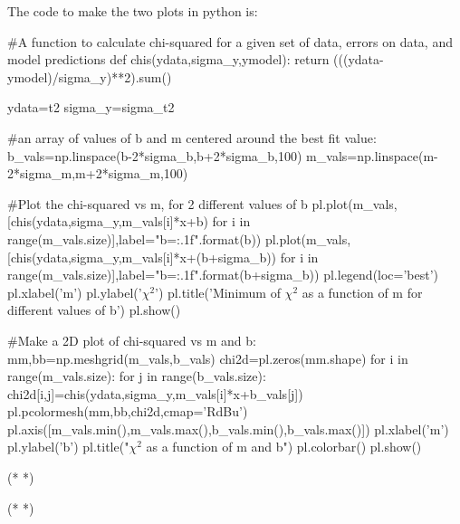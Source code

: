 The code to make the two plots in python is:
\begin{python}[caption = Plot chi-squared as a function of the fit parameters] 
#A function to calculate chi-squared for a given set of data, errors on data, and model predictions
def chis(ydata,sigma_y,ymodel):
    return (((ydata-ymodel)/sigma_y)**2).sum()

ydata=t2
sigma_y=sigma_t2

#an array of values of b and m centered around the best fit value:
b_vals=np.linspace(b-2*sigma_b,b+2*sigma_b,100)
m_vals=np.linspace(m-2*sigma_m,m+2*sigma_m,100)
    
#Plot the chi-squared vs m, for 2 different values of b    
pl.plot(m_vals,[chis(ydata,sigma_y,m_vals[i]*x+b) for i in range(m_vals.size)],label="b={:.1f}".format(b))
pl.plot(m_vals,[chis(ydata,sigma_y,m_vals[i]*x+(b+sigma_b)) for i in range(m_vals.size)],label="b={:.1f}".format(b+sigma_b))
pl.legend(loc='best')
pl.xlabel('m')
pl.ylabel('$\chi^2$')
pl.title('Minimum of $\chi^2$ as a function of m for different values of b')
pl.show()

#Make a 2D plot of chi-squared vs m and b:
mm,bb=np.meshgrid(m_vals,b_vals)
chi2d=pl.zeros(mm.shape)
for i in range(m_vals.size):
    for j in range(b_vals.size):
        chi2d[i,j]=chis(ydata,sigma_y,m_vals[i]*x+b_vals[j])
pl.pcolormesh(mm,bb,chi2d,cmap='RdBu')
pl.axis([m_vals.min(),m_vals.max(),b_vals.min(),b_vals.max()])
pl.xlabel('m')
pl.ylabel('b')
pl.title("$\chi^2$ as a function of m and b")
pl.colorbar()
pl.show()
\end{python} 
\begin{poutput}
(*  *)

(*  *)
\end{poutput}


